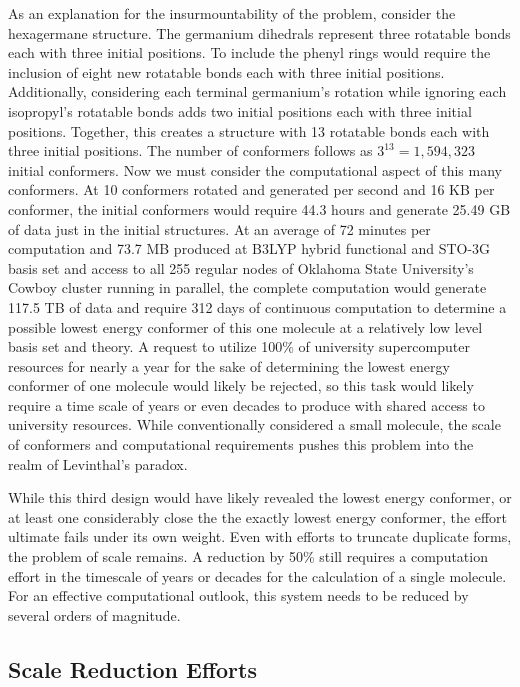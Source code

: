 As an explanation for the insurmountability of the problem, consider the hexagermane structure. 
The germanium dihedrals represent three rotatable bonds each with three initial positions. 
To include the phenyl rings would require the inclusion of eight new rotatable bonds each with three initial positions.
Additionally, considering each terminal germanium's rotation while ignoring each isopropyl's rotatable bonds adds two initial positions each with three initial positions. 
Together, this creates a structure with 13 rotatable bonds each with three initial positions. The number of conformers follows as $3^{13} = 1,594,323$ initial conformers. 
Now we must consider the computational aspect of this many conformers.
At 10 conformers rotated and generated per second and 16 KB per conformer, the initial conformers would require 44.3 hours and generate 25.49 GB of data just in the initial structures.
At an average of 72 minutes per computation and 73.7 MB produced at B3LYP hybrid functional and STO-3G basis set and access to all 255 regular nodes of Oklahoma State University's Cowboy cluster running in parallel, the complete computation would generate 117.5 TB of data and require 312 days of continuous computation to determine a possible lowest energy conformer of this one molecule at a relatively low level basis set and theory.
A request to utilize 100\% of university supercomputer resources for nearly a year for the sake of determining the lowest energy conformer of one molecule would likely be rejected, so this task would likely require a time scale of years or even decades to produce with shared access to university resources. 
While conventionally considered a small molecule, the scale of conformers and computational requirements pushes this problem into the realm of Levinthal's paradox.

While this third design would have likely revealed the lowest energy conformer, or at least one considerably close the the exactly lowest energy conformer, the effort ultimate fails under its own weight.
Even with efforts to truncate duplicate forms, the problem of scale remains.
A reduction by 50\% still requires a computation effort in the timescale of years or decades for the calculation of a single molecule.
For an effective computational outlook, this system needs to be reduced by several orders of magnitude.

\subsection{Scale Reduction Efforts}

